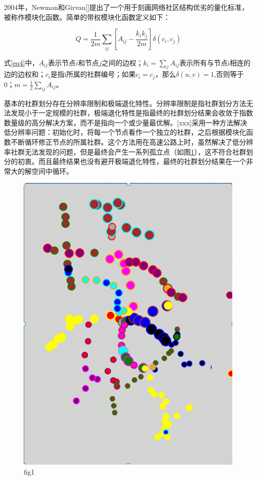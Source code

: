 		2004年，Newman和Girvan[]提出了一个用于刻画网络社区结构优劣的量化标准，被称作模块化函数。简单的带权模块化函数定义如下：

		\begin{equation}
		Q = \frac{1}{{2m}}\sum\limits_{ij} {[{A_{ij}} - \frac{{{k_i}{k_j}}}{{2m}}]\delta ({c_i},{c_j})}
		\label{eq4}
		\end{equation}

		式\ref{eq4}中，$A_{ij}$表示节点$i$和节点$j$之间的边权；$k_i=\sum\limits_{j} {A_{ij}}$表示所有与节点i相连的边的边权和；$c_i$是指i所属的社群编号；如果$c_i=c_j$，那么$\delta (u,v)=1$,否则等于0；$m=\frac{1}{{2}}\sum\limits_{ij} {A_{ij}}$。

		基本的社群划分存在分辨率限制和极端退化特性。分辨率限制是指社群划分方法无法发现小于一定规模的社群，极端退化特性是指最终的社群划分结果会收敛于指数数量级的高分解决方案，而不是指向一个或少量最优解。[xxx]采用一种方法解决低分辨率问题：初始化时，将每一个节点看作一个独立的社群，之后根据模块化函数不断循环修正节点的所属社群。这个方法用在高速公路上时，虽然解决了低分辨率社群无法发现的问题，但是最终会产生一系列孤立点（如图\ref{gulidian}），这不符合社群划分的初衷。而且最终结果也没有避开极端退化特性，最终的社群划分结果在一个非常大的解空间中循环。

		\begin{figure}[h]
		\centering
				\begin{minipage}{0.8\linewidth}
					\centering
					\includegraphics[width=4.4in]{picture/liuliangbianquan}
					\caption{fig1}
					\label{gulidian}
				\end{minipage}
		\end{figure}

